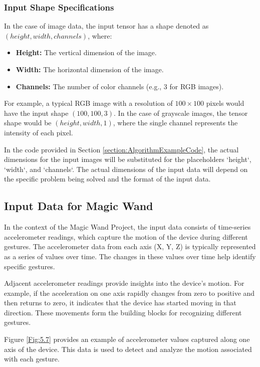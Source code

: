 \subsubsection{Input Shape Specifications}

In the case of image data, the input tensor has a shape denoted as $(height, width, channels)$, where:
\begin{itemize}
	\item \textbf{Height:} The vertical dimension of the image.
	\item \textbf{Width:} The horizontal dimension of the image.
	\item \textbf{Channels:} The number of color channels (e.g., 3 for RGB images).
\end{itemize}

For example, a typical RGB image with a resolution of $100 \times 100$ pixels would have the input shape $(100, 100, 3)$. In the case of grayscale images, the tensor shape would be $(height, width, 1)$, where the single channel represents the intensity of each pixel.

In the code provided in Section \ref{section:AlgorithmExampleCode}, the actual dimensions for the input images will be substituted for the placeholders `height`, `width`, and `channels`. The actual dimensions of the input data will depend on the specific problem being solved and the format of the input data.

\subsection{Input Data for Magic Wand}
\label{subsection:InputDataMagicWand}

In the context of the Magic Wand Project, the input data consists of time-series accelerometer readings, which capture the motion of the device during different gestures. The accelerometer data from each axis (X, Y, Z) is typically represented as a series of values over time. The changes in these values over time help identify specific gestures.

Adjacent accelerometer readings provide insights into the device's motion. For example, if the acceleration on one axis rapidly changes from zero to positive and then returns to zero, it indicates that the device has started moving in that direction. These movements form the building blocks for recognizing different gestures.

Figure \ref{Fig:5.7} provides an example of accelerometer values captured along one axis of the device. This data is used to detect and analyze the motion associated with each gesture.

